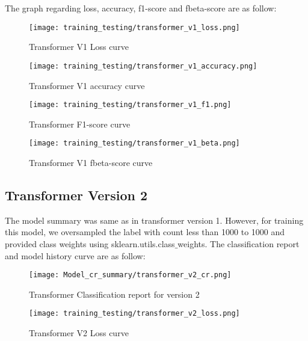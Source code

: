The graph regarding loss, accuracy, f1-score and fbeta-score are as follow:

\begin{figure}[H]
    \centering
    \texttt{[image: training\_testing/transformer\_v1\_loss.png]}
    \caption{Transformer V1 Loss curve}
    \label{fig:Transformer V1 loss curve}
\end{figure}

\begin{figure}[H]
    \centering
    \texttt{[image: training\_testing/transformer\_v1\_accuracy.png]}
    \caption{Transformer V1 accuracy curve}
    \label{fig:Transformer V1 accuracy curve}
\end{figure}

\begin{figure}[H]
    \centering
    \texttt{[image: training\_testing/transformer\_v1\_f1.png]}
    \caption{Transformer F1-score curve}
    \label{fig:Transformer F1-score curve}
\end{figure}

\begin{figure}[H]
    \centering
    \texttt{[image: training\_testing/transformer\_v1\_beta.png]}
    \caption{Transformer V1 fbeta-score curve}
    \label{fig:Transformer V1 fbeta-score curve}
\end{figure}

\subsection{Transformer Version 2}
The model summary was same as in transformer version 1. However, for training this model, we oversampled the label with count less than 1000 to 1000 and provided class weights using sklearn.utils.class$\_$weights. The classification report and model history curve are as follow:

\begin{figure}[H]
    \centering
    \texttt{[image: Model\_cr\_summary/transformer\_v2\_cr.png]}
    \caption{Transformer Classification report for version 2}
    \label{fig:Transformer Classification report for version 2}
\end{figure}

\begin{figure}[H]
    \centering
    \texttt{[image: training\_testing/transformer\_v2\_loss.png]}
    \caption{Transformer V2 Loss curve}
    \label{fig:Transformer V2 loss curve}
\end{figure}

